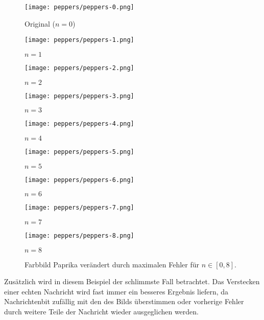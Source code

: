 \begin{figure}[h!]
  \centering
  \begin{minipage}[t]{0.3\textwidth}
    \texttt{[image: peppers/peppers-0.png]}
    \caption*{Original ($n = 0$)}
  \end{minipage}
  \hfill
  \begin{minipage}[t]{0.3\textwidth}
    \texttt{[image: peppers/peppers-1.png]}
    \caption*{$n = 1$}
  \end{minipage}
  \hfill
  \begin{minipage}[t]{0.3\textwidth}
    \texttt{[image: peppers/peppers-2.png]}
    \caption*{$n = 2$}
  \end{minipage}%
  \vspace{0.5cm}
  \begin{minipage}[t]{0.3\textwidth}
    \texttt{[image: peppers/peppers-3.png]}
    \caption*{$n = 3$}
  \end{minipage}
  \hfill
  \begin{minipage}[t]{0.3\textwidth}
    \texttt{[image: peppers/peppers-4.png]}
    \caption*{$n = 4$}
  \end{minipage}
  \hfill
  \begin{minipage}[t]{0.3\textwidth}
    \texttt{[image: peppers/peppers-5.png]}
    \caption*{$n = 5$}
  \end{minipage}%
  \vspace{0.5cm}
  \begin{minipage}[t]{0.3\textwidth}
    \texttt{[image: peppers/peppers-6.png]}
    \caption*{$n = 6$}
  \end{minipage}
  \hfill
  \begin{minipage}[t]{0.3\textwidth}
    \texttt{[image: peppers/peppers-7.png]}
    \caption*{$n = 7$}
  \end{minipage}
  \hfill
  \begin{minipage}[t]{0.3\textwidth}
    \texttt{[image: peppers/peppers-8.png]}
    \caption*{$n = 8$}
  \end{minipage}
  \caption{Farbbild Paprika verändert durch maximalen Fehler für $n \in [0,8]$.}
  \label{fig:peppers}
\end{figure}
\noindent
Zusätzlich wird in diesem Beispiel der schlimmste Fall betrachtet.
Das Verstecken einer echten Nachricht wird fast immer
ein besseres Ergebnis liefern, da Nachrichtenbit
zufällig mit den des Bilds überstimmen oder vorherige Fehler
durch weitere Teile der Nachricht wieder ausgeglichen werden.

